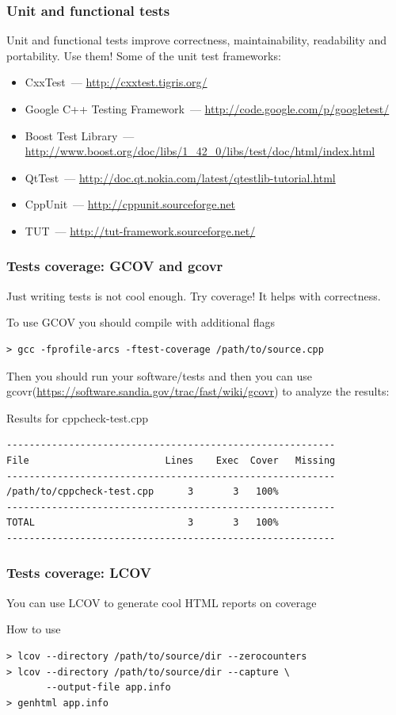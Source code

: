 \documentclass{beamer}
\begin{document}
\begin{frame}
\frametitle{Unit and functional tests}
Unit and functional tests improve correctness, maintainability, readability and portability. Use them! Some of the unit test frameworks:
\begin{itemize}
\item CxxTest~--- \url{http://cxxtest.tigris.org/}
\item Google C++ Testing Framework~--- \url{http://code.google.com/p/googletest/}
\item Boost Test Library~--- \url{http://www.boost.org/doc/libs/1_42_0/libs/test/doc/html/index.html}
\item QtTest~--- \url{http://doc.qt.nokia.com/latest/qtestlib-tutorial.html}
\item CppUnit~--- \url{http://cppunit.sourceforge.net}
\item TUT~--- \url{http://tut-framework.sourceforge.net/}
\end{itemize}
\end{frame}

\begin{frame}[fragile]
\frametitle{Tests coverage: GCOV and gcovr}
Just writing tests is not cool enough. Try coverage! It helps with correctness.
\begin{exampleblock}{To use GCOV you should compile with additional flags}
\begin{Verbatim}[fontsize=\small]
> gcc -fprofile-arcs -ftest-coverage /path/to/source.cpp
\end{Verbatim}
\end{exampleblock}
Then you should run your software/tests and then you can use gcovr(\url{https://software.sandia.gov/trac/fast/wiki/gcovr}) to analyze the results:
\begin{exampleblock}{Results for cppcheck-test.cpp}
\begin{Verbatim}[fontsize=\small]
----------------------------------------------------------
File                        Lines    Exec  Cover   Missing
----------------------------------------------------------
/path/to/cppcheck-test.cpp      3       3   100%   
----------------------------------------------------------
TOTAL                           3       3   100%
----------------------------------------------------------
\end{Verbatim}
\end{exampleblock}
\end{frame}

\begin{frame}[fragile]
\frametitle{Tests coverage: LCOV}
You can use LCOV to generate cool HTML reports on coverage
\begin{exampleblock}{How to use}
\begin{verbatim}
> lcov --directory /path/to/source/dir --zerocounters
> lcov --directory /path/to/source/dir --capture \
       --output-file app.info
> genhtml app.info
\end{verbatim}
\end{exampleblock}
\end{frame}
\end{document}
